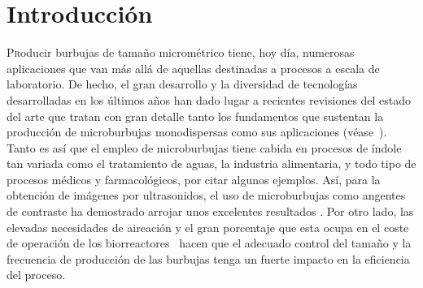 \chapter{Introducción}

\lettrine[lraise=-0.1, lines=2, loversize=0.2]{P}{r}oducir burbujas de tamaño micrométrico tiene, hoy día, numerosas aplicaciones que van más allá de aquellas destinadas a procesos  a escala de laboratorio. De hecho, el gran desarrollo y la diversidad de tecnologías desarrolladas en los últimos años han dado lugar a recientes revisiones del estado del arte que tratan con gran detalle tanto los fundamentos que sustentan la producción de microburbujas monodispersas como sus aplicaciones (véase~\cite{Rodriguez-Rodriguez2015b}). Tanto es así que el empleo de microburbujas tiene cabida en procesos de índole tan variada como el tratamiento de aguas, la industria alimentaria, y todo tipo de procesos médicos y farmacológicos, por citar algunos ejemplos. Así, para la obtención de imágenes por ultrasonidos, el uso de microburbujas como angentes de contraste ha demostrado arrojar unos excelentes resultados \cite{Ferrara2007,Kilbanov2006,Postema2005}. Por otro lado, las elevadas necesidades de aireación y el gran porcentaje que esta ocupa en el coste de operación de los biorreactores~\cite{Garcia-Ochoa2009,Rosso2008} hacen que el adecuado control del tamaño y la frecuencia de producción de las burbujas tenga un fuerte impacto en la eficiencia del proceso. 


